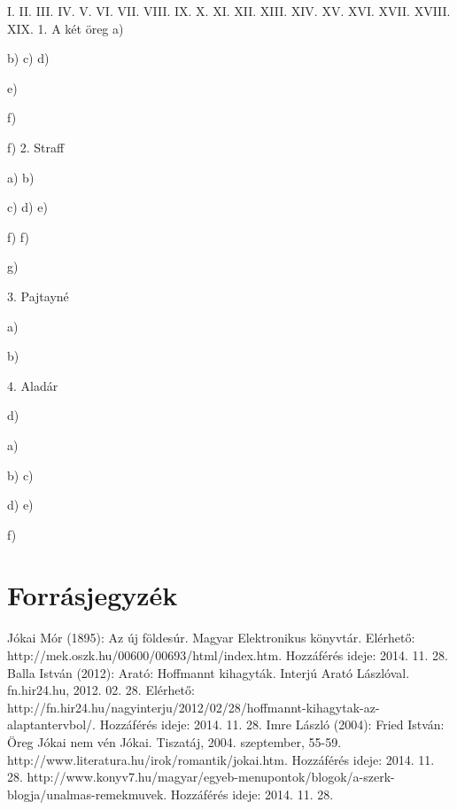\documentclass[a4paper,12pt]{thesis-ekf}
\begin{document}
    I.
    II.
    III.
    IV.
    V.
    VI.
    VII.
    VIII.
    IX.
    X.
    XI.
    XII.
    XIII.
    XIV.
    XV.
    XVI.
    XVII.
    XVIII.
    XIX.
    1. A két öreg
    a)


    b)
    c)
    d)






    e)


    f)


    f)
    2. Straff

    a)
    b)



    c)
    d)
    e)

    f)
    f)





    g)

    3. Pajtayné


    a)











    b)

    4. Aladár


    d)

    a)

    b)
    c)



    d)
    e)

    f)




    \chapter{Forrásjegyzék}

    Jókai Mór (1895): Az új földesúr. Magyar Elektronikus könyvtár. Elérhető: http://mek.oszk.hu/00600/00693/html/index.htm. Hozzáférés ideje: 2014. 11. 28.
    Balla István (2012): Arató: Hoffmannt kihagyták. Interjú Arató Lászlóval. fn.hir24.hu, 2012. 02. 28. Elérhető: http://fn.hir24.hu/nagyinterju/2012/02/28/hoffmannt-kihagytak-az-alaptantervbol/. Hozzáférés ideje: 2014. 11. 28.
    Imre László (2004): Fried István: Öreg Jókai nem vén Jókai. Tiszatáj, 2004. szeptember, 55-59.
    http://www.literatura.hu/irok/romantik/jokai.htm. Hozzáférés ideje: 2014. 11. 28.
    http://www.konyv7.hu/magyar/egyeb-menupontok/blogok/a-szerk-blogja/unalmas-remekmuvek. Hozzáférés ideje: 2014. 11. 28.
\end{document}
